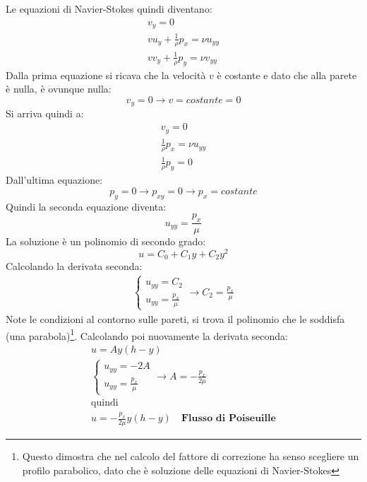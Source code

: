 Le equazioni di Navier-Stokes quindi diventano:
%
	\begin{equation*}
		\begin{gathered}
			v_y = 0\\
			v u_y + \frac{1}{\rho} p_x = \nu u_{yy}\\
			v v_y + \frac{1}{\rho} p_y = \nu v_{yy}
		\end{gathered}
	\end{equation*}
%
Dalla prima equazione si ricava che la velocità $v$ è costante e dato che alla parete è nulla, è ovunque nulla:
%
	\begin{equation*}
		v_y = 0 \rightarrow v = costante = 0
	\end{equation*}
%
Si arriva quindi a:
%
	\begin{equation*}
		\begin{gathered}
			v_y = 0\\
			\frac{1}{\rho} p_x = \nu u_{yy}\\
			\frac{1}{\rho} p_y = 0
		\end{gathered}
	\end{equation*}
%
Dall'ultima equazione:
%
	\begin{equation*}
		p_y = 0 \rightarrow p_{xy} = 0 \rightarrow p_x = costante
	\end{equation*}
%
Quindi la seconda equazione diventa:
%
	\begin{equation*}
		u_{yy} = \frac{p_x}{\mu}
	\end{equation*}
%
La soluzione è un polinomio di secondo grado:
%
	\begin{equation*}
		u = C_0 + C_1 y + C_2 y^2
	\end{equation*}
%
Calcolando la derivata seconda:
%
	\begin{equation*}
		\begin{gathered}
			\left\{
				\begin{aligned}
					u_{yy} = C_2\\
					u_{yy} = \frac{p_x}{\mu}
				\end{aligned}
			\right.
			\rightarrow C_2 = \frac{p_x}{\mu}
		\end{gathered}
	\end{equation*}
%
Note le condizioni al contorno sulle pareti, si trova il polinomio che le soddisfa (una parabola)\footnote{Questo dimostra che nel calcolo del fattore di correzione ha senso scegliere un profilo parabolico, dato che è soluzione delle equazioni di Navier-Stokes}.
Calcolando poi nuovamente la derivata seconda:
%
	\begin{equation*}
		\begin{gathered}
			u = A y (h - y)\\
			\left\{
				\begin{aligned}
					u_{yy} = -2 A\\
					u_{yy} = \frac{p_x}{\mu}
				\end{aligned}
			\right.
			\rightarrow A = - \frac{p_x}{2 \mu}\\
			\text{quindi}\\
			u = - \frac{p_x}{2 \mu} y (h - y) \quad \textbf{Flusso di Poiseuille}
		\end{gathered}
	\end{equation*}
